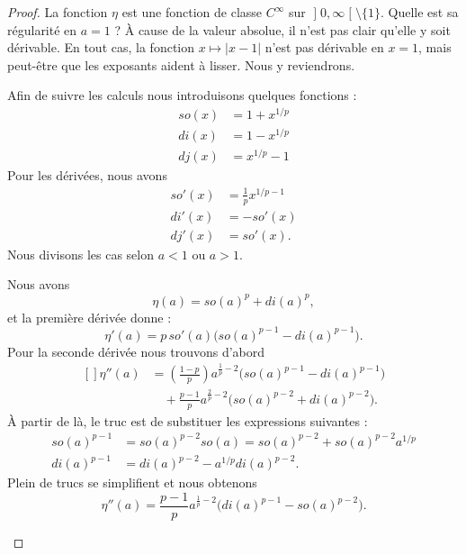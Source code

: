 \begin{proof}
	La fonction \( \eta\) est une fonction de classe \(  C^{\infty}\) sur \( \mathopen] 0 , \infty \mathclose[\setminus\{ 1 \}\). Quelle est sa régularité en \( a=1\) ? À cause de la valeur absolue, il n'est pas clair qu'elle y soit dérivable. En tout cas, la fonction \( x\mapsto| x-1 |\) n'est pas dérivable en \( x=1\), mais peut-être que les exposants aident à lisser. Nous y reviendrons.

		Afin de  suivre les calculs nous introduisons quelques fonctions :
		\begin{subequations}
			\begin{align}
				so(x) & =1+x^{1/p} \\
				di(x) & =1-x^{1/p} \\
				dj(x) & =x^{1/p}-1
			\end{align}
		\end{subequations}
		Pour les dérivées, nous avons
		\begin{subequations}
			\begin{align}
				so'(x) & =\frac{1}{ p }x^{1/p-1} \\
				di'(x) & =-so'(x)                \\
				dj'(x) & =so'(x).
			\end{align}
		\end{subequations}
		Nous divisons les cas selon \( a<1\) ou \( a>1\).
		\begin{subproof}

			\spitem[Pour \( a<1\)]
			Nous avons
			\begin{equation}
				\eta(a)=so(a)^p+di(a)^p,
			\end{equation}
			et la première dérivée donne :
			\begin{equation}        \label{EQooCLXZooXClOwd}
				\eta'(a)=p\,so'(a)\big( so(a)^{p-1}-di(a)^{p-1} \big).
			\end{equation}
			Pour la seconde dérivée nous trouvons d'abord
			\begin{equation}
				\begin{aligned}[]
					\eta''(a) & =\left( \frac{ 1-p }{ p } \right)a^{\frac{ 1 }{ p }-2}\big( so(a)^{p-1}-di(a)^{p-1} \big) \\
					          & \quad+\frac{ p-1 }{ p }a^{\frac{ 2 }{ p }-2}\big( so(a)^{p-2}+di(a)^{p-2} \big).
				\end{aligned}
			\end{equation}
			À partir de là, le truc est de substituer les expressions suivantes :
			\begin{subequations}
				\begin{align}
					so(a)^{p-1} & =so(a)^{p-2}so(a)=so(a)^{p-2}+so(a)^{p-2}a^{1/p} \\
					di(a)^{p-1} & =di(a)^{p-2}-a^{1/p}di(a)^{p-2}.
				\end{align}
			\end{subequations}
			Plein de trucs se simplifient et nous obtenons
			\begin{equation}
				\eta''(a)=\frac{ p-1 }{ p }a^{\frac{1}{ p }-2}\big( di(a)^{p-1}-so(a)^{p-2} \big).
			\end{equation}


\end{subproof}
\end{proof}
